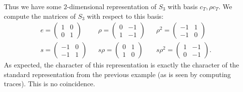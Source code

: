 \documentclass[11pt, english]{article}
\begin{document}
Thus we have some $2$-dimensional representation of $S_3$ with basis $c_T, \rho c_T$. We compute the matrices of $S_3$ with respect to this basis:
\begin{align*}
e =
\begin{pmatrix}
1 & 0 \\ 0 & 1
\end{pmatrix}
&&
\rho = 
\begin{pmatrix}
0 & -1 \\ 1 & -1
\end{pmatrix}
&&
\rho^2 =
\begin{pmatrix}
-1 & 1 \\ -1 & 0
\end{pmatrix} \\
s =
\begin{pmatrix}
-1 & 0 \\ -1 & 1
\end{pmatrix}
&&
s\rho  =
\begin{pmatrix}
0 & 1 \\ 1 & 0
\end{pmatrix}
&&
s\rho^2  =
\begin{pmatrix}
1 & -1 \\ 0 & -1
\end{pmatrix}.
\end{align*}
As expected, the character of this representation is exactly the character of the standard representation from the previous example (as is seen by computing traces). This is no coincidence.
\end{document}

